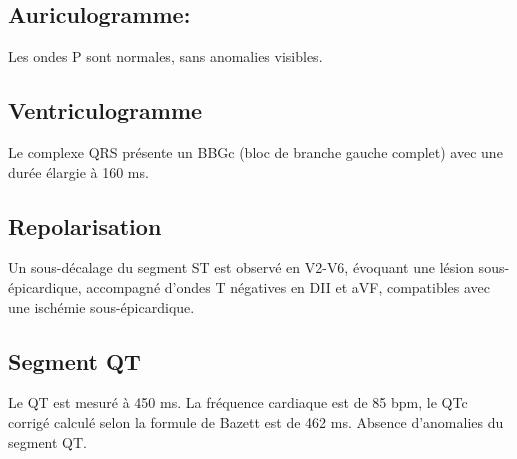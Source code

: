 \documentclass[12pt,a4paper]{article}%
\begin{document}
\subsection*{Auriculogramme:}%
\label{subsec:Auriculogramme}%

%
Les ondes P sont normales, sans anomalies visibles.%
\subsection*{Ventriculogramme}%
\label{subsec:Ventriculogramme}%

%
Le complexe QRS présente un BBGc (bloc de branche gauche complet) avec une durée élargie à 160 ms.%
\subsection*{Repolarisation}%
\label{subsec:Repolarisation}%

%
Un sous{-}décalage du segment ST est observé en V2{-}V6, évoquant une lésion sous{-}épicardique, accompagné d’ondes T négatives en DII et aVF, compatibles avec une ischémie sous{-}épicardique.%
\subsection*{Segment QT}%
\label{subsec:SegmentQT}%

%
Le QT est mesuré à 450 ms. La fréquence cardiaque est de 85 bpm, le QTc corrigé calculé selon la formule de Bazett est de 462 ms. Absence d’anomalies du segment QT.%
\\%
%
\vspace*{\baselineskip}%
\end{document}
